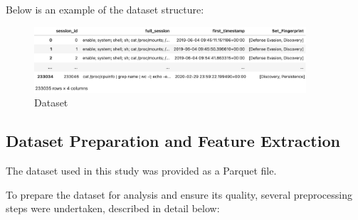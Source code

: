         \noindent Below is an example of the dataset structure:

        \begin{figure}[h!]
            \centering
            \includegraphics[width=0.9\textwidth]{figures/others/dataset_1.png}
            \vspace{-1em}
            \caption{Dataset}
            \label{fig:dataset_example}
        \end{figure}

    \vspace{-1em}

    \subsection{Dataset Preparation and Feature Extraction}

        The dataset used in this study was provided as a Parquet file.

        \noindent To prepare the dataset for analysis and ensure its quality, several preprocessing steps were undertaken, described in detail below:


